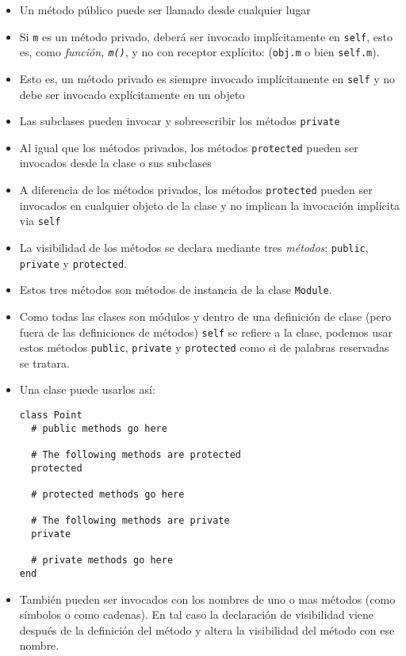 \begin{itemize}
\item Un método público puede ser llamado desde cualquier lugar
\item
Si \verb|m| es un método privado, deberá ser invocado implícitamente en \verb|self|,
esto es, como {\it función, \verb|m()|},
y no con receptor explícito: (\verb|obj.m| o bien \verb|self.m|).
\item
Esto es, un método privado es siempre invocado implícitamente en \verb|self|
y no debe ser invocado explícitamente en un objeto
\item Las subclases pueden invocar y sobreescribir los métodos \verb|private|

\item Al igual que los métodos privados, los métodos \verb|protected|
pueden ser invocados desde  la clase  o sus subclases
\item A diferencia de los métodos privados, los métodos \verb|protected|
pueden ser invocados en cualquier objeto de la clase
y no implican la invocación implícita via \verb|self|
\item La visibilidad de los métodos se declara mediante tres \emph{métodos}:
\verb|public|, \verb|private| y \verb|protected|. 

\item Estos tres métodos son métodos 
de instancia de la clase \verb|Module|.

\item Como todas las clases son módulos y dentro de una definición de clase
(pero fuera de las definiciones de métodos) \verb|self| se refiere a la clase, podemos usar 
estos métodos \verb|public|, \verb|private| y \verb|protected| como si de palabras reservadas se tratara.

\item Una clase puede usarlos así:
\begin{verbatim}
class Point
  # public methods go here

  # The following methods are protected
  protected

  # protected methods go here

  # The following methods are private
  private

  # private methods go here
end
\end{verbatim}
\item
También pueden ser invocados con los nombres de uno o mas métodos (como símbolos o como
cadenas). En tal caso la declaración de visibilidad viene después de la definición del método
y altera la visibilidad del método con ese nombre.


\end{itemize}
